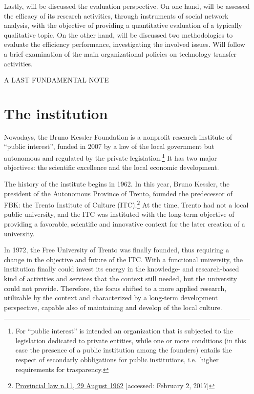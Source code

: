 Lastly, will be discussed the evaluation perspective. On one hand, will be assessed the efficacy of its research activities, through instruments of social network analysis, with the objective of providing a quantitative evaluation of a typically qualitative topic. On the other hand, will be discussed two methodologies to evaluate the efficiency performance, investigating the involved issues. Will follow a brief examination of the main organizational policies on technology transfer activities.

A LAST FUNDAMENTAL NOTE 

\section{The institution}

Nowadays, the Bruno Kessler Foundation is a nonprofit research institute of \enquote{public interest}, funded in 2007 by a law of the local government but autonomous and regulated by the private legislation.\footnote{For \enquote{public interest} is intended an organization that is subjected to the legislation dedicated to private entities, while one or more conditions (in this case the presence of a public institution among the founders) entails the respect of secondarly obbligations for public institutions, i.e.\ higher requirements for trasparency.} It has two major objectives: the scientific excellence and the local economic development.

The history of the institute begins in 1962. In this year, Bruno Kessler, the president of the Autonomous Province of Trento, founded the predecessor of FBK: the Trento Institute of Culture (ITC).\footnote{
	\href{http://www.consiglio.provincia.tn.it/leggi-e-archivi/codice-provinciale/archivio/Pages/Legge\%20provinciale\%2029\%20agosto\%201962,\%20n.\%2011_565.aspx}
	{Provincial law n.11, 29 August 1962}
	[accessed: February 2, 2017]
} At the time, Trento had not a local public university, and the ITC was instituted with the long-term objective of providing a favorable, scientific and innovative context for the later creation of a university. 

In 1972, the Free University of Trento was finally founded, thus requiring a change in the objective and future of the ITC. With a functional university, the institution finally could invest its energy in the knowledge- and research-based kind of activities and services that the context still needed, but the university could not provide. Therefore, the focus shifted to a more applied research, utilizable by the context and characterized by a long-term development perspective, capable also of maintaining and develop of the local culture.

